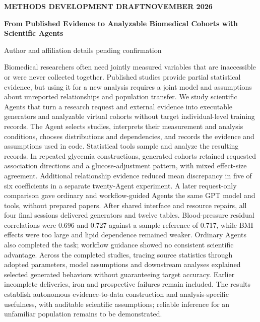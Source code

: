 \documentclass[11pt,letterpaper]{article}
\renewenvironment{abstract}{\small\par\noindent{\sffamily\bfseries\color{ink}Abstract}\quad\ignorespaces}{\par\medskip}
\begin{document}
\thispagestyle{plain}
{\sffamily\footnotesize\color{accent}\bfseries METHODS DEVELOPMENT DRAFT\quad\textbar\quad NOVEMBER 2026\par}
\vspace{.7em}
{\raggedright\sffamily\bfseries\fontsize{24}{29}\selectfont\color{ink}From Published Evidence to Analyzable Biomedical Cohorts with Scientific Agents\par}
\vspace{.5em}
{\small Author and affiliation details pending confirmation\par}
\vspace{.7em}
\begin{abstract}

Biomedical researchers often need jointly measured variables that are inaccessible or were never collected together. Published studies provide partial statistical evidence, but using it for a new analysis requires a joint model and assumptions about unreported relationships and population transfer. We study scientific Agents that turn a research request and external evidence into executable generators and analyzable virtual cohorts without target individual-level training records. The Agent selects studies, interprets their measurement and analysis conditions, chooses distributions and dependencies, and records the evidence and assumptions used in code. Statistical tools sample and analyze the resulting records. In repeated glycemia constructions, generated cohorts retained requested association directions and a glucose-adjustment pattern, with mixed effect-size agreement. Additional relationship evidence reduced mean discrepancy in five of six coefficients in a separate twenty-Agent experiment. A later request-only comparison gave ordinary and workflow-guided Agents the same GPT model and tools, without prepared papers. After shared interface and resource repairs, all four final sessions delivered generators and twelve tables. Blood-pressure residual correlations were 0.696 and 0.727 against a sample reference of 0.717, while BMI effects were too large and lipid dependence remained weaker. Ordinary Agents also completed the task; workflow guidance showed no consistent scientific advantage. Across the completed studies, tracing source statistics through adopted parameters, model assumptions and downstream analyses explained selected generated behaviors without guaranteeing target accuracy. Earlier incomplete deliveries, iron and prospective failures remain included. The results establish autonomous evidence-to-data construction and analysis-specific usefulness, with auditable scientific assumptions; reliable inference for an unfamiliar population remains to be demonstrated.

\end{abstract}
\end{document}
